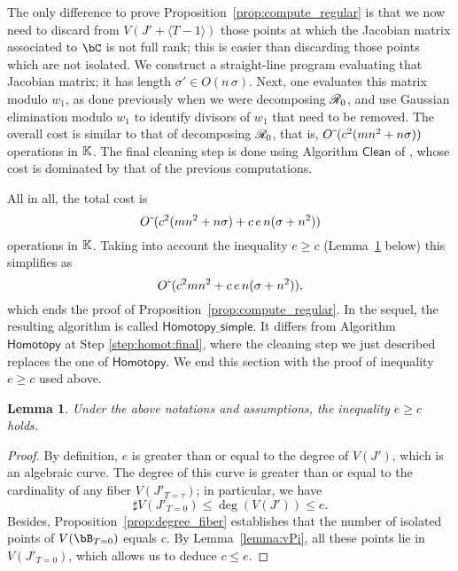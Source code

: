 \documentclass[12pt]{article}
\newtheorem{lemma}[definition]{Lemma}
\begin{document}
The only difference to prove Proposition~\ref{prop:compute_regular} is
that we now need to discard from $V(J' + \langle T-1\rangle)$ those
points at which the Jacobian matrix associated to $\bC$ is not full
rank; this is easier than discarding those points which are not
isolated. We construct a straight-line program evaluating that
Jacobian matrix; it has length
$\sigma'\in O(n \, \sigma)$. Next, one evaluates this matrix modulo
$w_1$, as done previously when we were decomposing $\mathscr{R}_0$, and use
Gaussian elimination modulo $w_1$ to identify divisors of $w_1$ that
need to be removed. The overall cost is similar to that of decomposing
$\mathscr{R}_0$, that is, ${O}{\,\tilde{ }\,}(c^2(mn^2+n\sigma))$ operations in $\mathbb{K}$.
The final cleaning step is done using Algorithm $\mathsf{Clean}$ of
\cite{GiLeSa01}, whose cost is dominated by that of the previous computations.

All in all, the total cost is
$$
{O}{\,\tilde{ }\,}(c^2(mn^2+n\sigma) + c\, e\,n (\sigma+n^2)  )
$$
operations in $\mathbb{K}$. Taking into account the inequality
$e\geq c$ (Lemma~\ref{lemma:e-geq-c} below) this simplifies as 
$$
{O}{\,\tilde{ }\,}(c^2 mn^2  + c\, e\,n (\sigma+n^2) ),
$$
which ends the proof of Proposition~\ref{prop:compute_regular}. In the
sequel, the resulting algorithm is called
$\mathsf{Homotopy\_simple}$. It differs from Algorithm
$\mathsf{Homotopy}$ at Step \ref{step:homot:final}, where the cleaning step we
just described replaces the one of $\mathsf{Homotopy}$.
We end this section with the proof of inequality $e\geq c$ used above.
\begin{lemma}\label{lemma:e-geq-c}
Under the above notations and assumptions, the inequality $e\geq c$ holds.   
\end{lemma}
\begin{proof}
  By definition, $e$ is greater than or equal to the degree of
  $V(J')$, which is an algebraic curve.  The degree of this curve is
  greater than or equal to the cardinality of any fiber
  $V(J'_{T=\tau})$; in particular, we have
  \[
  \sharp V(J'_{T=0}) \leq \deg(V(J')) \leq e.
  \]
  Besides, Proposition~\ref{prop:degree_fiber} establishes that the
  number of isolated points of $V(\bB_{T=0})$ equals $c$. By Lemma~\ref{lemma:vPi}, all
  these points lie in $V(J'_{T=0})$, which allows us to deduce $c\leq e$.
\end{proof}

\end{document}
